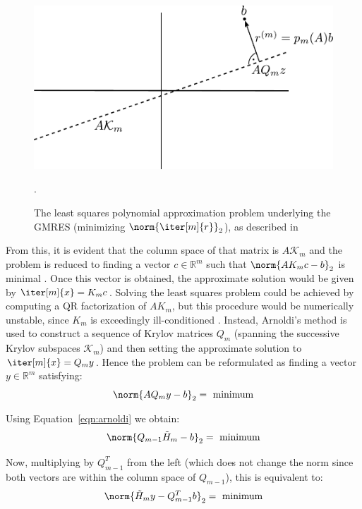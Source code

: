 \begin{figure}[h]
    \centering
    \includegraphics[width=0.7\linewidth]{figures/GMRES.pdf}
    \caption[GMRES - Least Squares Approximation]{The least squares polynomial approximation problem underlying the GMRES (minimizing $\norm{\iter[m]{r}}_2$), as described in \cite{trefethen_numerical_1997}}.
    \label{fig:gmres}
\end{figure}

\noindent From this, it is evident that the column space of that matrix is $A\mathcal{K}_m$ and the problem is reduced to finding a vector $c \in \mathbb{R}^{m}$ such that $\norm{AK_mc-b}_2$ is minimal   \cite{trefethen_numerical_1997}. Once this vector is obtained, the approximate solution would be given by $\iter[m]{x} =K_mc$. Solving the least squares problem could be achieved by computing a QR factorization of $AK_m$, but this procedure would be numerically unstable, since $K_m$ is exceedingly ill-conditioned \cite{trefethen_numerical_1997}. Instead, Arnoldi's method is used to construct a sequence of Krylov matrices $Q_m$ (spanning the successive Krylov subspaces $\mathcal{K}_m$) and then setting the approximate solution to $\iter[m]{x} = Q_my$. Hence the problem can be reformulated as finding a vector $y \in \mathbb{R}^m$ satisfying:
\begin{equation}
    \norm{AQ_my-b}_2=\text{ minimum}
\end{equation}

\noindent Using Equation~\hyperref[eqn:arnoldi]{\ref{eqn:arnoldi}} we obtain:
\begin{equation}
    \norm{Q_{m-1}\tilde{H}_m-b}_2=\text{ minimum}
\end{equation}

\noindent Now, multiplying by $Q^T_{m-1}$ from the left (which does not change the norm since both vectors are within the column space of $Q_{m-1}$), this is equivalent to:
\begin{equation}
    \norm{\tilde{H}_my-Q^T_{m-1}b}_2 = \text{ minimum}
\end{equation}

